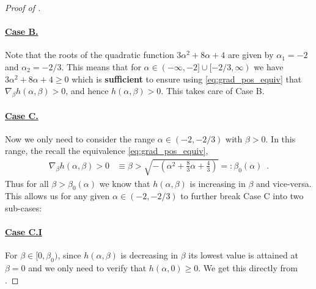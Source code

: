 \begin{proof}[Proof of ]
    \paragraph{\underline{Case B.}} Note that the roots of the quadratic function $3\alpha^2 + 8\alpha + 4$ are given by $\alpha_1 = -2$ and $\alpha_2 = -2/3$. This means that for $\alpha \in (-\infty, -2]\cup[-2/3,\infty)$ we have $3\alpha^2 + 8\alpha + 4 \geq 0$ which is \textbf{sufficient} to ensure using \eqref{eq:grad_pos_equiv} that $\nabla_\beta h(\alpha, \beta) > 0$, and hence $h(\alpha, \beta) > 0$. This takes care of Case B. 
    
    \paragraph{\underline{Case C.}} Now we only need to consider the range $\alpha \in (-2,-2/3)$ with $\beta>0$. In this range, the recall the equivalence \eqref{eq:grad_pos_equiv}, 
    \begin{align*}
        \nabla_\beta h(\alpha, \beta) > 0 &\equiv \beta > \sqrt{-\left(\alpha^2 + \frac{8}{3}\alpha + \frac{4}{3}\right)} =: \beta_0(\alpha)\enspace.
    \end{align*}
    Thus for all $\beta > \beta_0(\alpha)$ we know that $h(\alpha, \beta)$ is increasing in $\beta$ and vice-versa. This allows us for any given $\alpha\in (-2,-2/3)$ to further break Case C into two sub-cases:
    
    \paragraph{\underline{Case C.I}} For $\beta \in [0, \beta_0)$, since $h(\alpha, \beta)$ is decreasing in $\beta$ its lowest value is attained at $\beta=0$ and we only need to verify that $h(\alpha, 0) \geq 0$. We get this directly from .
    

\end{proof}
